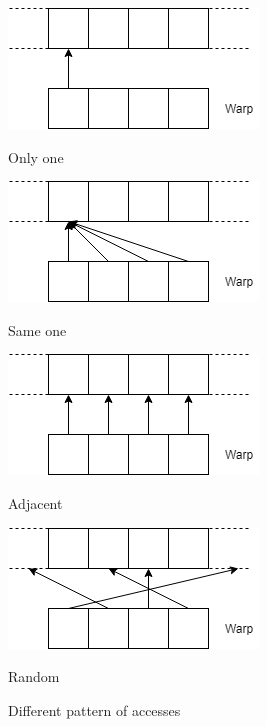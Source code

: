 \begin{figure}[ht] 
  \label{TypeOfAccesses} 
  \begin{minipage}[b]{0.5\linewidth}
    \centering
    \includegraphics[width=.5\linewidth]{Chapters/Accesses/access-OnlyOne.png} 
    \caption{Only one} 
    \vspace{4ex}
  \end{minipage}%
  \begin{minipage}[b]{0.5\linewidth}
    \centering
    \includegraphics[width=.5\linewidth]{Chapters/Accesses/access-SameOne.png} 
    \caption{Same one} 
    \vspace{4ex}
  \end{minipage} 
  \begin{minipage}[b]{0.5\linewidth}
    \centering
    \includegraphics[width=.5\linewidth]{Chapters/Accesses/access-Adjacent.png} 
    \caption{Adjacent} 
    \vspace{4ex}
  \end{minipage}%
  \begin{minipage}[b]{0.5\linewidth}
    \centering
    \includegraphics[width=.5\linewidth]{Chapters/Accesses/access-random.png} 
    \caption{Random} 
    \vspace{4ex}
  \end{minipage} 
  \caption{Different pattern of accesses}
\end{figure}

